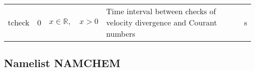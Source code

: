 \documentclass[twoside,11pt,fleqn,a4paper,english,openright]{report}
\begin{document}
\begin{center}
  \tablelasttail{
        &&&&\\\hline
  }
\begin{supertabular}{|l|p{1.6cm}|p{4cm}|p{6cm}|l|}
  tcheck	& 0	& $x \in \mathbb{R}, \quad x>0$	& Time interval between checks of velocity divergence and Courant numbers	& s\\
\end{supertabular}
\end{center}

\subsection{Namelist NAMCHEM}\label{par:chem}
\end{document}
